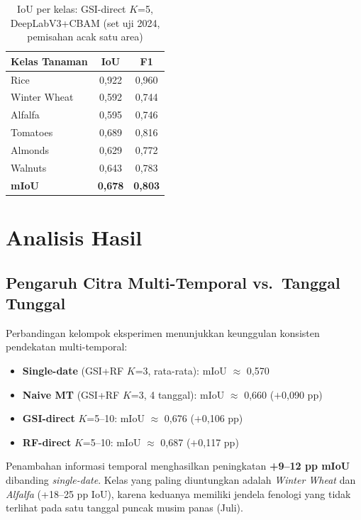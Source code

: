 \begin{table}[H]
    \centering
    \caption{IoU per kelas: GSI-direct $K$=5, DeepLabV3+CBAM (set uji 2024, pemisahan acak satu area)}
    \label{tab:gsi_k5_per_kelas}
    \begin{tabular}{|l|c|c|}
    \hline
    \textbf{Kelas Tanaman} & \textbf{IoU} & \textbf{F1} \\
    \hline
    Rice           & 0,922 & 0,960 \\
    Winter Wheat   & 0,592 & 0,744 \\
    Alfalfa        & 0,595 & 0,746 \\
    Tomatoes       & 0,689 & 0,816 \\
    Almonds        & 0,629 & 0,772 \\
    Walnuts        & 0,643 & 0,783 \\
    \hline
    \textbf{mIoU}  & \textbf{0,678} & \textbf{0,803} \\
    \hline
    \end{tabular}
\end{table}

\section{Analisis Hasil}

\subsection{Pengaruh Citra Multi-Temporal vs.\ Tanggal Tunggal}

Perbandingan kelompok eksperimen menunjukkan keunggulan konsisten pendekatan multi-temporal:

\begin{itemize}
    \item \textbf{Single-date} (GSI+RF $K$=3, rata-rata): mIoU $\approx$ 0,570
    \item \textbf{Naive MT} (GSI+RF $K$=3, 4 tanggal): mIoU $\approx$ 0,660 ($+$0,090 pp)
    \item \textbf{GSI-direct} $K$=5--10: mIoU $\approx$ 0,676 ($+$0,106 pp)
    \item \textbf{RF-direct} $K$=5--10: mIoU $\approx$ 0,687 ($+$0,117 pp)
\end{itemize}

Penambahan informasi temporal menghasilkan peningkatan \textbf{+9--12 pp mIoU} dibanding \textit{single-date}.
Kelas yang paling diuntungkan adalah \textit{Winter Wheat} dan \textit{Alfalfa} (+18--25 pp IoU), karena keduanya memiliki jendela fenologi yang tidak terlihat pada satu tanggal puncak musim panas (Juli).

